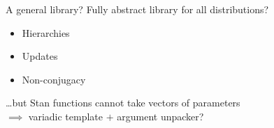 \begin{frame}{A general library?}
	Fully abstract library for all distributions?
	\begin{itemize}
		\item Hierarchies
		\item Updates
		\item Non-conjugacy
	\end{itemize}
	\vspace{10pt}
	\dots but Stan functions cannot take vectors of parameters \\
	$\implies$ variadic template $+$ argument unpacker?
\end{frame}


